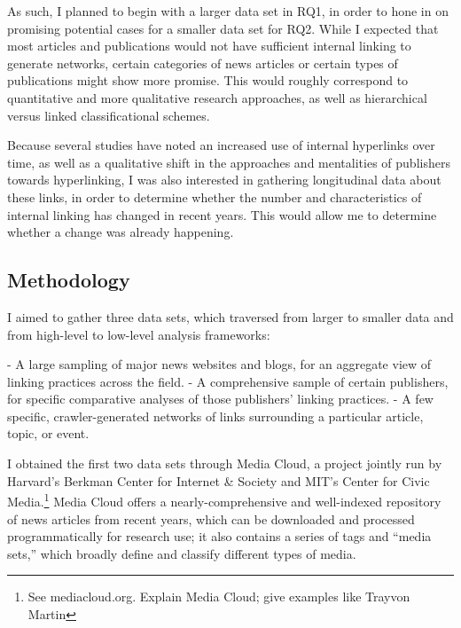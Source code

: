 As such, I planned to begin with a larger data set in RQ1, in order to hone in on promising potential cases for a smaller data set for RQ2. While I expected that most articles and publications would not have sufficient internal linking to generate networks, certain categories of news articles or certain types of publications might show more promise. This would roughly correspond to quantitative and more qualitative research approaches, as well as hierarchical versus linked classificational schemes.

Because several studies have noted an increased use of internal hyperlinks over time, as well as a qualitative shift in the approaches and mentalities of publishers towards hyperlinking, I was also interested in gathering longitudinal data about these links, in order to determine whether the number and characteristics of internal linking has changed in recent years. This would allow me to determine whether a change was already happening.

\subsection{Methodology}

I aimed to gather three data sets, which traversed from larger to smaller data and from high-level to low-level analysis frameworks:

- A large sampling of major news websites and blogs, for an aggregate view of linking practices across the field.
- A comprehensive sample of certain publishers, for specific comparative analyses of those publishers' linking practices.
- A few specific, crawler-generated networks of links surrounding a particular article, topic, or event.

I obtained the first two data sets through Media Cloud, a project jointly run by Harvard's Berkman Center for Internet \& Society and MIT's Center for Civic Media.\footnote{See mediacloud.org. Explain Media Cloud; give examples like Trayvon Martin} Media Cloud offers a nearly-comprehensive and well-indexed repository of news articles from recent years, which can be downloaded and processed programmatically for research use; it also contains a series of tags and ``media sets,'' which broadly define and classify different types of media.

